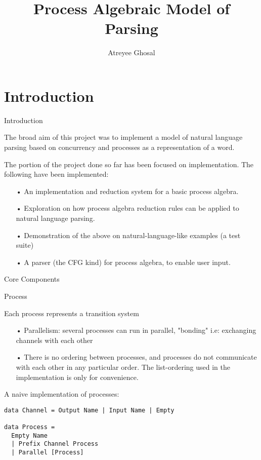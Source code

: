 \documentclass{beamer}
\title[Process Algebra Parsing]{Process Algebraic Model of Parsing}
\author{Atreyee Ghosal}
\institute{20161167}
\begin{document}
\begin{frame}
  \titlepage
\end{frame}

\section{Introduction}

\begin{frame}{Introduction}

The broad aim of this project was to implement a model of natural language parsing based on concurrency and processes as a representation of a word.

The portion of the project done so far has been focused on implementation. The following have been implemented:

\begin{itemize}
\item[•]
An implementation and reduction system for a basic process algebra.
\item[•]
Exploration on how process algebra reduction rules can be applied to natural language parsing.
\item[•]
Demonstration of the above on natural-language-like examples (a test suite)
\item[•]
A parser (the CFG kind) for process algebra, to enable user input.
\end{itemize}
 
\end{frame}


\begin{frame}[fragile]{Core Components}

\begin{block}{Process}

Each process represents a transition system

\begin{itemize}
\item[•]
Parallelism: several processes can run in parallel, "bonding" i.e: exchanging channels with each other
\item[•]
There is no ordering between processes, and processes do not communicate with each other in any particular order. The list-ordering used in the implementation is only for convenience.
\end{itemize}

A naive implementation of processes: 

\begin{lstlisting}
data Channel = Output Name | Input Name | Empty

data Process =
  Empty Name
  | Prefix Channel Process
  | Parallel [Process]
\end{lstlisting}

\end{block}

\end{frame}
\end{document}
